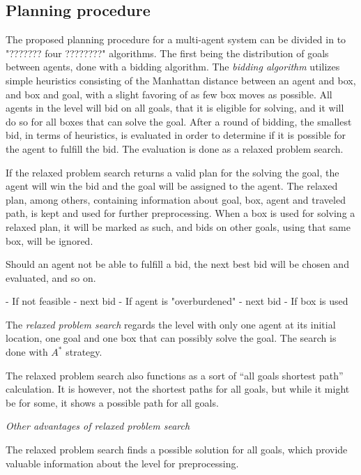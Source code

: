 \documentclass[Main]{subfiles}
\begin{document}
\subsection{Planning procedure}

The proposed planning procedure for a multi-agent system can be divided in to "??????? four ????????" algorithms. The first being the distribution of goals between agents, done with a bidding algorithm. 
The \textit{bidding algorithm} utilizes simple heuristics consisting of the Manhattan distance between an agent and box, and box and goal, with a slight favoring of as few box moves as possible. All agents in the level will bid on all goals, that it is eligible for solving, and it will do so for all boxes that can solve the goal. After a round of bidding, the smallest bid, in terms of heuristics, is evaluated in order to determine if it is possible for the agent to fulfill the bid. The evaluation is done as a relaxed problem search. 

If the relaxed problem search returns a valid plan for the solving the goal, the agent will win the bid and the goal will be assigned to the agent. The relaxed plan, among others, containing information about goal, box, agent and traveled path, is kept and used for further preprocessing. 
When a box is used for solving a relaxed plan, it will be marked as such, and bids on other goals, using that same box, will be ignored. 

Should an agent not be able to fulfill a bid, the next best bid will be chosen and evaluated, and so on. 





- If not feasible - next bid
- If agent is "overburdened" - next bid
- If box is used

\cite{VanderKrogt2005}


The \textit{relaxed problem search} regards the level with only one agent at its initial location, one goal and one box that can possibly solve the goal. The search is done with $A^*$ strategy. 

The relaxed problem search also functions as a sort of ``all goals shortest path'' calculation. It is however, not the shortest paths for all goals, but while it might be for some, it shows a possible path for all goals. 


\textit{Other advantages of relaxed problem search}

The relaxed problem search finds a possible solution for all goals, which provide valuable information about the level for preprocessing. 
\end{document}
